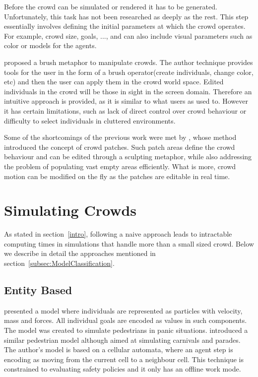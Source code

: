 \documentclass[6pt]{article}
\begin{document}
\begin{multicols}{2}
Before the crowd can be simulated or rendered it has to be generated.
Unfortunately, this task has not been researched as deeply as the rest.
This step essentially involves defining the initial parameters at which the crowd operates.
For example, crowd size, goals, ..., and can also include visual parameters such as color or models for the agents.

\cite{Ulicny2004} proposed a brush metaphor to manipulate crowds.
The author technique provides tools for the user in the form of a brush operator(create individuals, change color, etc) and then the user can apply them in the crowd world space.
Edited individuals in the crowd will be those in sight in the screen domain.
Therefore an intuitive approach is provided, as it is similar to what users as used to.
However it has certain limitations, such as lack of direct control over crowd behaviour or difficulty to select individuals in cluttered environments.

Some of the shortcomings of the previous work were met by \cite{Jordao2014}, whose method introduced the concept of crowd patches.
Such patch areas define the crowd behaviour and can be edited through a sculpting metaphor, while also addressing the problem of populating vast empty areas efficiently.
What is more, crowd motion can be modified on the fly as the patches are editable in real time.

\section{Simulating Crowds}

As stated in section~\ref{intro}, following a naive approach leads to intractable computing times in simulations that handle more than a small sized crowd.
Below we describe in detail the approaches mentioned in section~\ref{subsec:ModelClassification}. 

\subsection{Entity Based}

\cite{Helbing2000} presented a model where individuals are represented as particles with velocity, mass and forces.
All individual goals are encoded as values in such components.
The model was created to simulate pedestrians in panic situations.
\cite{batty2003} introduced a similar pedestrian model although aimed at simulating carnivals and parades.
The author's model is based on a cellular automata, where an agent step is encoding as moving from the current cell to a neighbour cell.
This technique is constrained to evaluating safety policies and it only has an offline work mode.


\end{multicols}
\end{document}
